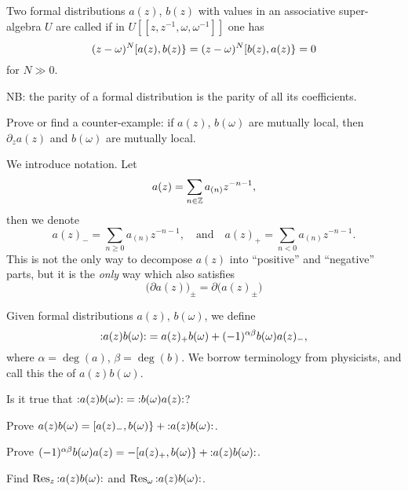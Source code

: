 Two formal distributions $a(z)$, $b(z)$ with values in an associative
super-algebra $U$ are called  if in
$U[[z,z^{-1},\omega,\omega^{-1}]]$ one has
\begin{equation}
(z-\omega)^N\superb{a(z)}{b(z)}=(z-\omega)^N\superb{b(z)}{a(z)}=0
\end{equation}
for $N\gg0$.

NB: the parity of a formal distribution is the parity of all its
coefficients.

\begin{xca}
Prove or find a counter-example: if $a(z)$, $b(\omega)$ are mutually
local, then $\partial_{z}a(z)$ and $b(\omega)$ are mutually local.
\end{xca}

\M
We introduce notation.
Let
\begin{equation}
a(z)=\sum_{n\in\ZZ}a_{(n)}z^{-n-1},
\end{equation}
then we denote
\begin{equation}
a(z)_{-}=\sum_{n\geq0}a_{(n)}z^{-n-1},
\quad\mbox{and}\quad
a(z)_{+}=\sum_{n<0}a_{(n)}z^{-n-1}.
\end{equation}
This is not the only way to decompose $a(z)$ into ``positive'' and
``negative'' parts, but it is the \emph{only} way which also satisfies
\begin{equation}
\bigl(\partial a(z)\bigr)_{\pm}=\partial\bigl(a(z)_{\pm}\bigr)
\end{equation}

Given formal distributions $a(z)$, $b(\omega)$, we define
\begin{equation}
\normOrd{a(z)b(\omega)} = a(z)_{+}b(\omega)+(-1)^{\alpha\beta}b(\omega)a(z)_{-},
\end{equation}
where $\alpha=\deg(a)$, $\beta=\deg(b)$. We borrow terminology from
physicists, and call this the  of $a(z)b(\omega)$.

\begin{xca}
Is it true that $\normOrd{a(z)b(\omega)}=\normOrd{b(\omega)a(z)}$?
\end{xca}
\begin{xca}
Prove
$a(z)b(\omega)=\superb{a(z)_{-}}{b(\omega)}+\normOrd{a(z)b(\omega)}$.
\end{xca}
\begin{xca}
Prove
$(-1)^{\alpha\beta}b(\omega)a(z)=-\superb{a(z)_{+}}{b(\omega)}+\normOrd{a(z)b(\omega)}$.
\end{xca}
\begin{xca}
Find $\Res[z]{\normOrd{a(z)b(\omega)}}$ and 
$\Res[\omega]{\normOrd{a(z)b(\omega)}}$.
\end{xca}

